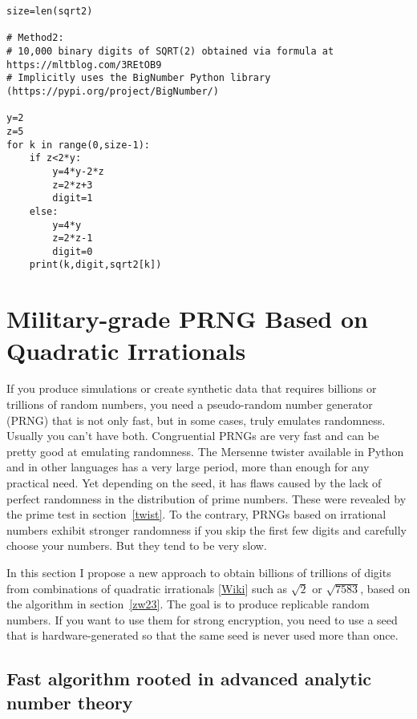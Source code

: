 \documentclass[oneside,10pt]{book}
\begin{document}
\begin{lstlisting}
size=len(sqrt2)

# Method2:
# 10,000 binary digits of SQRT(2) obtained via formula at https://mltblog.com/3REtOB9
# Implicitly uses the BigNumber Python library (https://pypi.org/project/BigNumber/)

y=2
z=5
for k in range(0,size-1):
    if z<2*y:
        y=4*y-2*z
        z=2*z+3
        digit=1
    else:
        y=4*y
        z=2*z-1
        digit=0
    print(k,digit,sqrt2[k])
\end{lstlisting}


\section{Military-grade PRNG Based on Quadratic Irrationals}\label{pivizintrobvbc}

If you produce simulations or create \textcolor{index}{synthetic data}
 that requires billions or trillions of random numbers, you
 need a pseudo-random number generator (PRNG) that is not only fast, but in some cases, truly emulates randomness.
 Usually you can't have both. Congruential PRNGs are very fast and can be pretty good at emulating randomness.
 The Mersenne twister available in Python and in other languages has a very large period, more than enough for any
 practical need. Yet depending on the seed, it has flaws caused by the lack of perfect randomness in the distribution of prime numbers. These were revealed by the \textcolor{index}{prime test} in section~\ref{twist}. To the contrary, PRNGs based on irrational numbers exhibit
 stronger randomness if you skip the first few digits and carefully choose your numbers. But they tend to be very slow.

In this section I propose a new approach to obtain billions of trillions of digits  from combinations of
\textcolor{index}{quadratic irrationals} [\href{https://en.wikipedia.org/wiki/Quadratic_irrational_number}{Wiki}] such as
 $\sqrt{2}$ or $\sqrt{7583}$, based on the algorithm in section~\ref{zw23}. The goal is to produce replicable random numbers. If you want to use them for strong encryption, you need to use a seed that is hardware-generated so that the same seed is never used more than once.

\subsection{Fast algorithm rooted in advanced analytic number theory}\label{nt6hg4xz}
\end{document}
